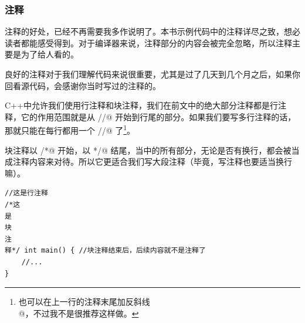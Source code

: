 \subsubsection*{注释}
注释的好处，已经不再需要我多作说明了。本书示例代码中的注释详尽之致，想必读者都能感受得到。对于编译器来说，注释部分的内容会被完全忽略，所以注释主要是为了给人看的。\par
良好的注释对于我们理解代码来说很重要，尤其是过了几天到几个月之后，如果你回看源代码，会感谢你当时写过的注释的。\par
C++中允许我们使用行注释和块注释，我们在前文中的绝大部分注释都是行注释，它的作用范围就是从 \lstinline@//@ 开始到行尾的部分。如果我们要写多行注释的话，那就只能在每行都用一个 \lstinline@//@ 了\footnote{也可以在上一行的注释末尾加反斜线 \lstinline@\\@，不过我不是很推荐这样做。}。\par
块注释以 \lstinline@/*@ 开始，以 \lstinline@*/@ 结尾，当中的所有部分，无论是否有换行，都会被当成注释内容来对待。所以它更适合我们写大段注释（毕竟，写注释也要适当换行嘛）。\par
\begin{lstlisting}
//这是行注释
/*这
是
块
注
释*/ int main() { //块注释结束后，后续内容就不是注释了
    //...
}
\end{lstlisting}\par
